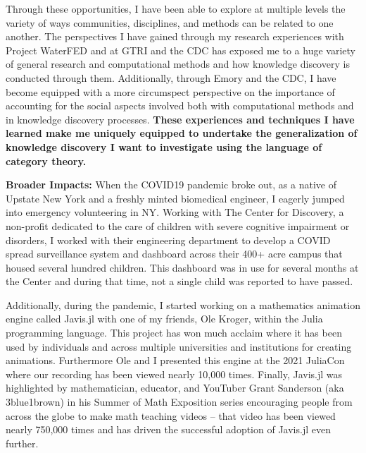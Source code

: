 \documentclass[11pt]{extarticle}
\begin{document}
Through these opportunities, I have been able to explore at multiple levels the variety of ways communities, disciplines, and methods can be related to one another.
The perspectives I have gained through my research experiences with Project WaterFED and at GTRI and the CDC has exposed me to a huge variety of general research and computational methods and how knowledge discovery is conducted through them.
Additionally, through Emory and the CDC, I have become equipped with a more circumspect perspective on the importance of accounting for the social aspects involved both with computational methods and in knowledge discovery processes.
\textbf{These experiences and techniques I have learned make me uniquely equipped to undertake the generalization of knowledge discovery I want to investigate using the language of category theory.}

\textbf{Broader Impacts:} When the COVID19 pandemic broke out, as a native of Upstate New York and a freshly minted biomedical engineer, I eagerly jumped into emergency volunteering in NY.
Working with The Center for Discovery, a non-profit dedicated to the care of children with severe cognitive impairment or disorders, I worked with their engineering department to develop a COVID spread surveillance system and dashboard across their 400+ acre campus that housed several hundred children.
This dashboard was in use for several months at the Center and during that time, not a single child was reported to have passed.

Additionally, during the pandemic, I started working on a mathematics animation engine called Javis.jl with one of my friends, Ole Kroger, within the Julia programming language.
This project has won much acclaim where it has been used by individuals and across multiple universities and institutions for creating animations.
Furthermore Ole and I presented this engine at the 2021 JuliaCon where our recording has been viewed nearly 10,000 times.
Finally, Javis.jl was highlighted by mathematician, educator, and YouTuber Grant Sanderson (aka 3blue1brown) in his Summer of Math Exposition series encouraging people from across the globe to make math teaching videos -- that video has been viewed nearly 750,000 times and has driven the successful adoption of Javis.jl even further.
\end{document}

